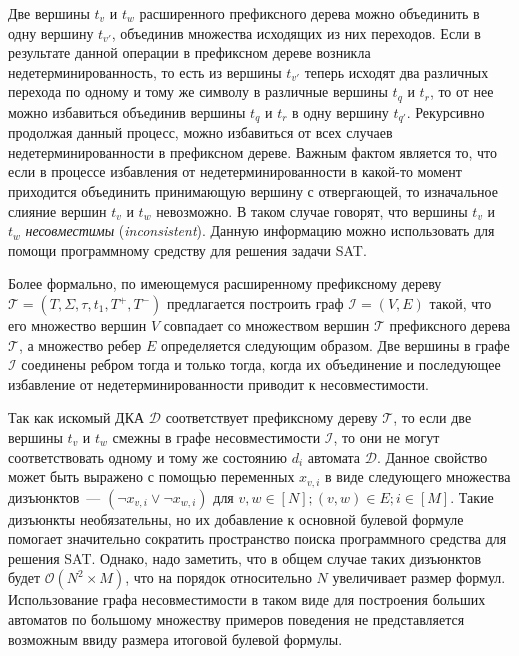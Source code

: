 Две вершины $t_{v}$ и $t_{w}$ расширенного префиксного дерева можно объединить в одну вершину $t_{v'}$, объединив множества исходящих из них переходов.
Если в результате данной операции в префиксном дереве возникла недетерминированность, то есть из вершины $t_{v'}$ теперь исходят два различных перехода по одному и тому же символу в различные вершины $t_{q}$ и $t_{r}$, то от нее можно избавиться объединив вершины $t_{q}$ и $t_{r}$ в одну вершину $t_{q'}$. 
Рекурсивно продолжая данный процесс, можно избавиться от всех случаев недетерминированности в префиксном дереве.
Важным фактом является то, что если в процессе избавления от недетерминированности в какой-то момент приходится объединить принимающую вершину с отвергающей, то изначальное слияние вершин $t_{v}$ и $t_{w}$ невозможно.
В таком случае говорят, что вершины $t_{v}$ и $t_{w}$ \emph{несовместимы} (\emph{inconsistent}).
Данную информацию можно использовать для помощи программному средству для решения задачи SAT.

Более формально, по имеющемуся расширенному префиксному дереву $\mathcal{T} = \left(T,\Sigma,\tau,t_{1},T^{+},T^{-}\right)$ предлагается построить граф $\mathcal{I} = \left(V, E\right)$ такой, что его множество вершин $V$ совпадает со множеством вершин $\mathcal{T}$ префиксного дерева $\mathcal{T}$, а множество ребер $E$ определяется следующим образом. 
Две вершины в графе $\mathcal{I}$ соединены ребром тогда и только тогда, когда их объединение и последующее избавление от недетерминированности приводит к несовместимости. 

Так как искомый ДКА $\mathcal{D}$ соответствует префиксному дереву $\mathcal{T}$, то если две вершины $t_{v}$ и $t_{w}$ смежны в графе несовместимости $\mathcal{I}$, то они не могут соответствовать одному и тому же состоянию $d_{i}$ автомата $\mathcal{D}$.
Данное свойство может быть выражено с помощью переменных $x_{v,i}$ в виде следующего множества дизъюнктов~{---} $\left(\neg x_{v,i} \vee \neg x_{w,i}\right)$ для $v,w \in \left[N\right]; \left(v,w\right) \in E; i \in \left[M\right]$.
Такие дизъюнкты необязательны, но их добавление к основной булевой формуле помогает значительно сократить пространство поиска программного средства для решения SAT. 
Однако, надо заметить, что в общем случае таких дизъюнктов будет $\mathcal{O}\left(N^{2} \times M\right)$, что на порядок относительно $N$ увеличивает размер формул. 
Использование графа несовместимости в таком виде для построения больших автоматов по большому множеству примеров поведения не представляется возможным ввиду размера итоговой булевой формулы. 

